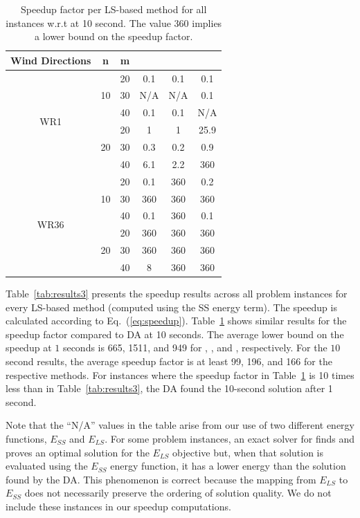 \documentclass[preprint,12pt]{elsarticle}
\newcommand{\qcls}{{\sf {\small QC-LS\xspace}}}
\newcommand{\ilpls}{{\sf {\small ILP-LS\xspace}}}
\newcommand{\qclsgrb}{{\sf {\small QC-LS(GRB)\xspace}}}
\newcommand{\ilplsgrb}{{\sf {\small ILP-LS(GRB)\xspace}}}
\newcommand{\qulsgrb}{{\sf {\small QU-LS(GRB)\xspace}}}
\newcommand{\qulsda}{{\sf {\small QU-LS(DA)\xspace}}}
\begin{document}
\begin{table}[t!]
	\small
	\begin{tabular}{| c | c | c | c | c | c | }
		\toprule
		Wind Directions  & n  & m  & \qcls &  \ilpls & \qulsgrb  \\
		\toprule
		\multirow{6}{*}{WR1}  & \multirow{3}{*}{10}  & 20 & 0.1       & 0.1 & 0.1  \\
		& & 30   & N/A & N/A & 0.1     \\
		& & 40 & 0.1 & 0.1 & N/A                \\
		\cline{2-6}
		&\multirow{3}{*}{20}   & 20  & 1  & 1  & 25.9         \\
		&&30   & 0.3 & 0.2  & 0.9    \\
		&&40   & 6.1 & 2.2  & 360        \\
		\hline
		\multirow{6}{*}{WR36} &  \multirow{3}{*}{10}    & 20 & 0.1       & 360 & 0.2  \\
		&& 30  & 360 & 360 & 360                     \\
		&&40   & 0.1 & 360 & 0.1          \\
		\cline{2-6}
		&  \multirow{3}{*}{20}   & 20   & 360  & 360 & 360            \\
		&&30   &  360  & 360 & 360                    \\
		&&40   &  8  & 360 & 360 \\
		
		\bottomrule                   
	\end{tabular}
	
	\vspace{0.5em}
	\caption{Speedup factor per LS-based method for all instances w.r.t \qulsda{} at 10 second. The value 360 implies a lower bound on the speedup factor.}\label{tab:results4}
\end{table}
Table~\ref{tab:results3} presents the speedup results across all problem instances
for every LS-based method (computed using the SS energy term). The speedup is calculated according to Eq.~(\ref{eq:speedup}). Table~\ref{tab:results4} shows similar results for the speedup factor
compared to DA at 10 seconds. The average lower bound on the speedup at $1$ seconds
is 665,	1511, and 949 for \qclsgrb, \qulsgrb, and \ilplsgrb, respectively. For the $10$ second
results, the average
speedup factor is at least 99, 196, and	166 for the respective methods.
For instances where the speedup factor in Table~\ref{tab:results4} is 10 times less than in Table~\ref{tab:results3},
the DA found the 10-second solution after 1 second.

Note that the ``N/A'' values in the table arise from our use of two different energy functions, $E_{SS}$ and $E_{LS}$. For some problem instances, an exact solver for \qcls{} finds and proves an optimal solution for the $E_{LS}$ objective but, when that solution is evaluated using the $E_{SS}$ energy function, it has a lower energy than the solution found by the DA. This phenomenon is correct because the mapping from $E_{LS}$ to $E_{SS}$ does not necessarily preserve the ordering of solution quality. We do not include these instances in our speedup computations.  




%

\end{document}
